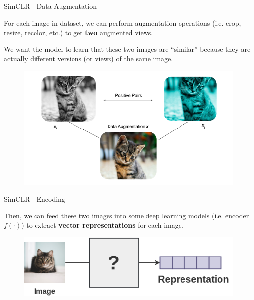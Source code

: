 \documentclass[aspectratio=169,mathserif]{beamer}  %
\newcommand{\tb}{\textbf}
\begin{document}
\begin{frame}{SimCLR - Data Augmentation}

For each image in dataset, we can perform augmentation operations (i.e. crop, resize, recolor, etc.) to get \tb{two} augmented views. 

We want the model to learn that these two images are “similar” because they are actually different versions (or views) of the same image.

\begin{figure}[t]
\centerline{\includegraphics[width=0.7\linewidth]{figure4.png}}
\label{fig1}
\end{figure}

\end{frame}



\begin{frame}{SimCLR - Encoding}

Then, we can feed these two images into some deep learning models (i.e. encoder~$f(\cdot)$) to extract \tb{vector representations} for each image.

\begin{figure}[t]
\centerline{\includegraphics[width=0.7\linewidth]{figure3.png}}
\label{fig1}
\end{figure}

\end{frame}
\end{document}
